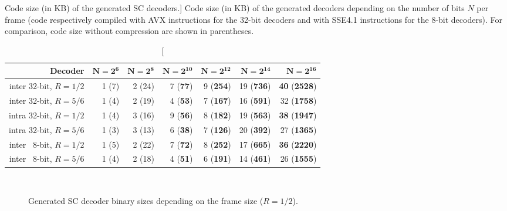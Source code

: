 \begin{table}[htp]
  \centering
  \caption
    [Code size (in KB) of the generated SC decoders.]
    {Code size (in KB) of the generated decoders depending on the number of bits
    $N$ per frame (code respectively compiled with AVX instructions for the
    32-bit decoders and with SSE4.1 instructions for the 8-bit decoders). For
    comparison, code size without compression are shown in parentheses.}
  \label{tab:eval_polar_sc_gen_l1i_size}
  \begin{tabular}{r r r r r r r}
    \textbf{Decoder}         & $\bm{N = 2^6}$ & $\bm{N = 2^8}$ & $\bm{N = 2^{10}}$ & $\bm{N = 2^{12}}$ & $\bm{N = 2^{14}}$ & $\bm{N = 2^{16}}$           \\
    \hline
    \hline
    inter 32-bit, $R = 1/2$  & 1 (7)          & 2 (24)         & 7 (\textbf{77})   & 9 (\textbf{254})  & 19 (\textbf{736}) & \textbf{40} (\textbf{2528}) \\
    inter 32-bit, $R = 5/6$  & 1 (4)          & 2 (19)         & 4 (\textbf{53})   & 7 (\textbf{167})  & 16 (\textbf{591}) & 32          (\textbf{1758}) \\
    intra 32-bit, $R = 1/2$  & 1 (4)          & 3 (16)         & 9 (\textbf{56})   & 8 (\textbf{182})  & 19 (\textbf{563}) & \textbf{38} (\textbf{1947}) \\
    intra 32-bit, $R = 5/6$  & 1 (3)          & 3 (13)         & 6 (\textbf{38})   & 7 (\textbf{126})  & 20 (\textbf{392}) & 27          (\textbf{1365}) \\
    inter ~8-bit, $R = 1/2$  & 1 (5)          & 2 (22)         & 7 (\textbf{72})   & 8 (\textbf{252})  & 17 (\textbf{665}) & \textbf{36} (\textbf{2220}) \\
    inter ~8-bit, $R = 5/6$  & 1 (4)          & 2 (18)         & 4 (\textbf{51})   & 6 (\textbf{191})  & 14 (\textbf{461}) & 26          (\textbf{1555}) \\
  \end{tabular}
\end{table}

\begin{figure}[htp]
  \centering
  \\
  \caption{Generated SC decoder binary sizes depending on the frame size
    ($R=1/2$).}
  \label{plot:eval_polar_sc_gen_l1i_size}
\end{figure}

